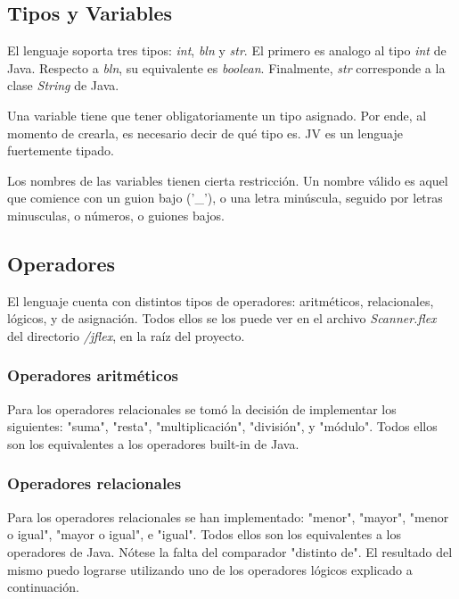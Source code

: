 \documentclass{article}
\begin{document}
        \subsection{Tipos y Variables}
            \par El lenguaje soporta tres tipos: \textit{int}, \textit{bln} y \textit{str}. El primero es analogo al tipo \textit{int} de Java. Respecto a \textit{bln}, su equivalente es \textit{boolean}. Finalmente, \textit{str} corresponde a la clase \textit{String} de Java. 
            \par Una variable tiene que tener obligatoriamente un tipo asignado. Por ende, al momento de crearla, es necesario decir de qué tipo es. JV es un lenguaje fuertemente tipado.
            \par Los nombres de las variables tienen cierta restricción. Un nombre válido es aquel que comience con un guion bajo ('\_'), o una letra minúscula, seguido por letras minusculas, o números, o guiones bajos.

        \subsection{Operadores}
            \par El lenguaje cuenta con distintos tipos de operadores: aritméticos, relacionales, lógicos, y de asignación. Todos ellos se los puede ver en el archivo \textit{Scanner.flex} del directorio \textit{/jflex}, en la raíz del proyecto.
            \subsubsection{Operadores aritméticos}
                \par Para los operadores relacionales se tomó la decisión de implementar los siguientes: "suma", "resta", "multiplicación", "división", y "módulo". Todos ellos son los equivalentes a los operadores built-in de Java.
            \subsubsection{Operadores relacionales}
                \par Para los operadores relacionales se han implementado: "menor", "mayor", "menor o igual", "mayor o igual", e "igual". Todos ellos son los equivalentes a los operadores de Java. Nótese la falta del comparador "distinto de". El resultado del mismo puedo lograrse utilizando uno de los operadores lógicos explicado a continuación.
\end{document}
